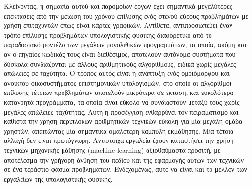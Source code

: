 Κλείνοντας, η σημασία αυτού και παρομοίων έργων έχει σημαντικά μεγαλύτερες επεκτάσεις από την μείωση του χρόνου επίλυσης ενός στενού εύρους προβλημάτων με χρήση επιταχυντών όπως είναι κάρτες γραφικών.
Αντίθετα, αντιπροσωπεύει έναν τρόπο επίλυσης προβλημάτων υπολογιστικής φυσικής διαφορετικό από το παραδοσιακό μοντέλο των μεγάλων μονολιθικών προγραμμάτων, τα οποία, ακόμη και αν ο πηγαίος κωδικάς τους είναι διαθέσιμος, αποτελούν αυτόνομα συστήματα που δύσκολα συνδιάζονται με άλλους αριθμητικούς αλγορίθμους, ειδικά χωρίς μεγάλες απώλειες σε ταχύτητα.
Ο τρόπος αυτός είναι η ανάπτυξη ενός ομοιόμορφου και ανοικτού οικοσυστήματος επιστημονικών υπολογισμών, στο οποίο οι αλγόριθμοι επίλυσης τέτοιων προβλημάτων αποτελούν μικρότερα σε έκταση, και ευκολότερα κατανοητά προγράμματα, τα οποία είναι εύκολο να συνδιαστούν μεταξύ τους χωρίς μεγάλες απώλειες ταχύτητας.
Αυτή η προσέγγιση ενθαρρύνει τον πειραματισμό και καθιστά την χρήση περίπλοκων αριθμητικών τεχνικών εύκολη για μία μεγάλη ομάδα χρηστών, απαιτώντας μία σημαντικά ομαλότερη καμπύλη εκμάθησης.
Μία τέτοια αλλαγή δεν είναι πρωτόγνωρη.
Αντίστοιχα εργαλεία έχουν καταστήσει την χρήση τεχνικών μηχανικής μάθησης (machine learning) αξιοθαύμαστα προσιτή, με αποτέλεσμα την γρήγορη άνθηση του πεδίου και της εφαρμογής αυτών των τεχνικών σε ένα τεράστιο φάσμα προβλημάτων.
Ενδεχομένως, αυτό να είναι και το μέλλον των εργαλείων της υπολογιστικής φυσικής.



